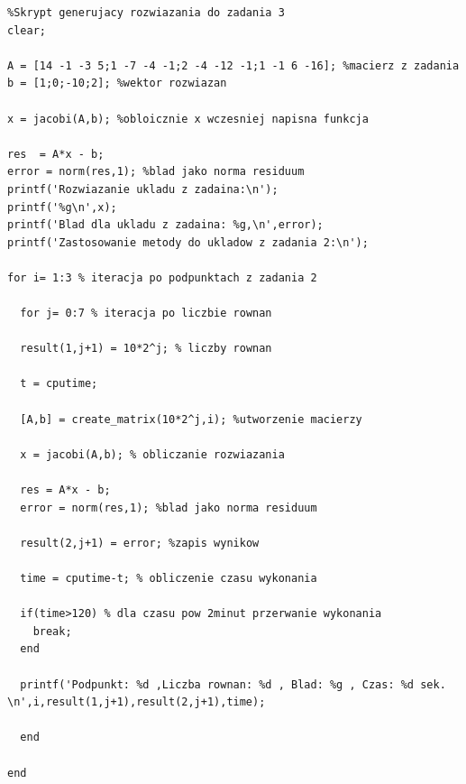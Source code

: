 \documentclass[a4paper, 11pt]{article}
\begin{document}
\begin{lstlisting}
%Skrypt generujacy rozwiazania do zadania 3
clear; 

A = [14 -1 -3 5;1 -7 -4 -1;2 -4 -12 -1;1 -1 6 -16]; %macierz z zadania
b = [1;0;-10;2]; %wektor rozwiazan

x = jacobi(A,b); %obloicznie x wczesniej napisna funkcja

res  = A*x - b; 
error = norm(res,1); %blad jako norma residuum
printf('Rozwiazanie ukladu z zadaina:\n');
printf('%g\n',x);
printf('Blad dla ukladu z zadaina: %g,\n',error); 
printf('Zastosowanie metody do ukladow z zadania 2:\n'); 

for i= 1:3 % iteracja po podpunktach z zadania 2

  for j= 0:7 % iteracja po liczbie rownan
  
  result(1,j+1) = 10*2^j; % liczby rownan
  
  t = cputime; 

  [A,b] = create_matrix(10*2^j,i); %utworzenie macierzy
  
  x = jacobi(A,b); % obliczanie rozwiazania
  
  res = A*x - b;
  error = norm(res,1); %blad jako norma residuum
  
  result(2,j+1) = error; %zapis wynikow
    
  time = cputime-t; % obliczenie czasu wykonania
  
  if(time>120) % dla czasu pow 2minut przerwanie wykonania
    break; 
  end
  
  printf('Podpunkt: %d ,Liczba rownan: %d , Blad: %g , Czas: %d sek. \n',i,result(1,j+1),result(2,j+1),time);

  end
  
end

\end{lstlisting}
\end{document}
